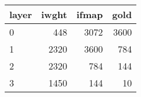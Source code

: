 \begin{tabular}{lrrr}
\toprule
layer &  iwght &  ifmap &  gold \\
\midrule
    0 &    448 &   3072 &  3600 \\
    1 &   2320 &   3600 &   784 \\
    2 &   2320 &    784 &   144 \\
    3 &   1450 &    144 &    10 \\
\bottomrule
\end{tabular}
